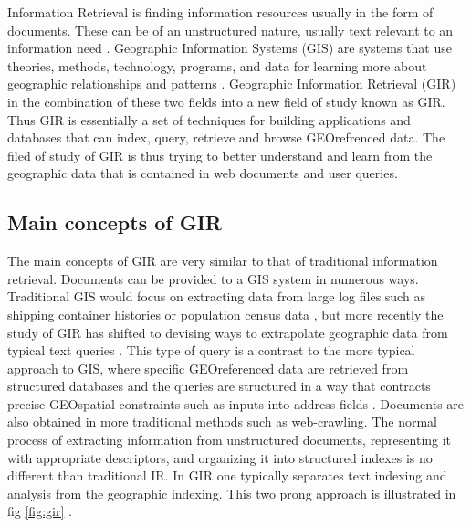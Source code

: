 \documentclass[10pt, conference, compsocconf]{IEEEtran}
\begin{document}
 Information Retrieval is finding information resources usually in the form of documents. These can be of an unstructured nature, usually text relevant to an information need \cite{Korfhage:2008fe}. Geographic Information Systems (GIS) are systems that use theories, methods, technology, programs, and data for learning more about geographic relationships and patterns \cite{Jones:2008isa}. Geographic Information Retrieval (GIR) in the combination of these two fields into a new field of study known as GIR. Thus GIR is essentially a set of techniques for building applications and databases that can index, query, retrieve and browse GEOrefrenced data. The filed of study of GIR is thus trying to better understand and learn from the geographic data that is contained in web documents and user queries. 
 
 \subsection{Main concepts of GIR}
 The main concepts of GIR are very similar to that of traditional information retrieval. Documents can be provided to a GIS system in numerous ways. Traditional GIS would focus on extracting data from large log files such as shipping container histories or population census data \cite{Jones:2008isa}, but more recently the study of GIR has shifted to devising ways to extrapolate geographic data from typical text queries \cite{Long:2018ta}. This type of query is a contrast to the more typical approach to GIS, where specific GEOreferenced data are retrieved from structured databases and the queries are structured in a way that contracts precise GEOspatial constraints such as inputs into address fields \cite{Larson:1996wq}. Documents are also obtained in more traditional methods such as web-crawling. The normal process of extracting information from unstructured documents, representing it with appropriate descriptors, and organizing it into structured indexes is no different than traditional IR. In GIR one typically separates text indexing and analysis from the geographic indexing. This two prong approach is illustrated in fig \ref{fig:gir} .
 
\end{document}

